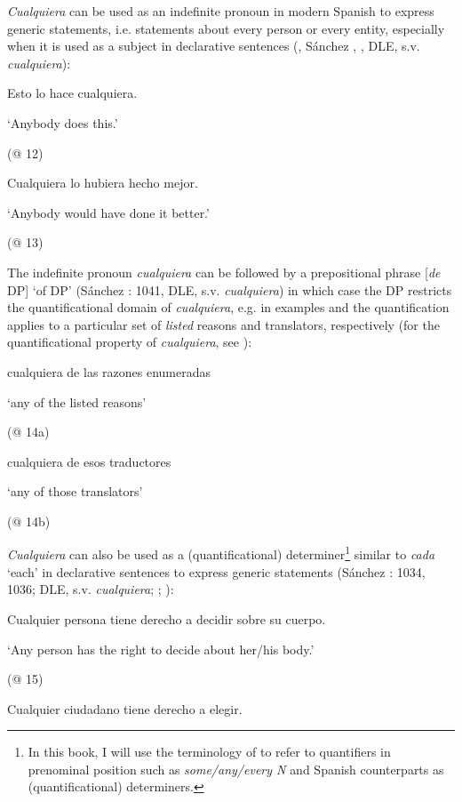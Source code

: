 \textit{Cualquiera} can be used as an indefinite pronoun in modern Spanish to express generic statements, i.e. statements about every person or every entity, especially when it is used as a subject in declarative sentences (\citealt{Brucart1999}, Sánchez \citealt{López1999}, \citealt{Eberenz2000}, DLE, s.v. \textit{cualquiera}):

  Esto lo hace cualquiera. 

  ‘Anybody does this.’

  (@ 12)

  Cualquiera lo hubiera hecho mejor. 

  ‘Anybody would have done it better.’

  (@ 13)

The indefinite pronoun \textit{cualquiera} can be followed by a prepositional phrase [\textit{de} DP] ‘of DP’ (Sánchez \citealt{López1999}: 1041, DLE, s.v. \textit{cualquiera}) in which case the DP restricts the quantificational domain of \textit{cualquiera}, e.g. in examples  and  the quantification applies to a particular set of \textit{listed} reasons and translators, respectively (for the quantificational property of \textit{cualquiera}, see ):

\label{bkm:Ref72400832}  cualquiera de las razones enumeradas

  ‘any of the listed reasons’

  (@ 14a)

\label{bkm:Ref533953098}  cualquiera de esos traductores

  ‘any of those translators’

  (@ 14b)

\textit{Cualquiera} can also be used as a (quantificational) determiner\footnote{{In this book, I will use the terminology of \citet{Zamparelli2000} to refer to quantifiers in prenominal position such as} {\textit{some/any/every N}} {and Spanish counterparts as (quantificational) determiners.}} similar to \textit{cada} ‘each’ in declarative sentences to express generic statements (Sánchez \citealt{López1999}: 1034, 1036; DLE, s.v. \textit{cualquiera}; \citealt{Menéndez-Benito2010}; \citealt{Rivero2011}):

  Cualquier persona tiene derecho a decidir sobre su cuerpo.

  ‘Any person has the right to decide about her/his body.’

  (@ 15)

  Cualquier ciudadano tiene derecho a elegir. 

